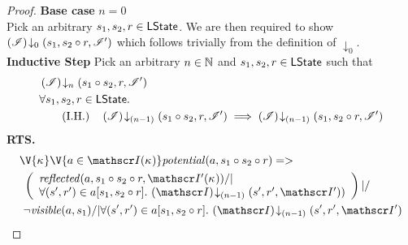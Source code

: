 \begin{lemma}
\begin{proof}
\noindent\textbf{Base case }$n=0$\\
Pick an arbitrary $s_1, s_2, r \in \textsf{LState}$. We are then required to show	$\left(\mathscr{I}\right) \!\downarrow_{0} \left(s_1, s_2 \circ r, \mathscr{I}'\right) $ which follows trivially from the definition of $\downarrow_0$.\\

\noindent\textbf{Inductive Step} Pick an arbitrary $n \in \mathbb{N}$ and $s_1, s_2, r \in \textsf{LState}$ such that
%
\begin{align}
	& \extendsAMUpto{\lmod}{n}{s_1 \composeL s_2}{r}{\lmod'} \label{LCS:Ass1}\\
%
	&	\for{s_1, s_2, r \in \LStates} \nonumber \\	
	& \tag{I.H.} \quad\extendsAMUpto{\lmod}{(n-1)}{s_1 \composeL s_2}{r}{\lmod'} \implies 
										\extendsAMUpto{\lmod}{(n-1)}{s_1}{s_2 \composeL r}{\lmod'} \label{LCS:IH}
\end{align}
%
\textbf{RTS. }
%
\begin{align}
%    
%  
  &\V{\ca{}}\V{a\in \lmod(\ca{})}
  \m{potential}(a,s_1 \composeL s_2 \composeL r) =>\null \nonumber \\
  &\ \left(
	\begin{array}{l}
		\m{reflected}(a,s_1 \composeL s_2 \composeL r,\lmod'(\ca{})) /|\\
		\for{(s', r') \in a[s_1, s_2 \composeL r]} \extendsAMUpto{\lmod}{(n-1)}{s'}{r'}{\lmod'})
	\end{array}	  
  \right) |/\null \nonumber \\
%  
  &\ \neg\m{visible}(a,s_1) /| \for{(s', r') \in a[s_1, s_2 \composeL r]} \extendsAMUpto{\lmod}{(n-1)}{s'}{r'}{\lmod'}  \label{LCS:Goal3}
%
\end{align}
%
%
%
%
%


\end{proof}
\end{lemma}
